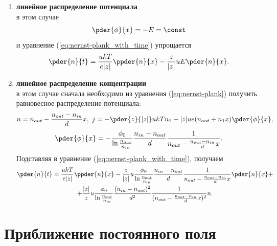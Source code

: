 \documentclass{hedwork}
\begin{document}
    \begin{enumerate}
        \item \textbf{линейное распределение потенциала}\\
            в этом случае
            \[
                \pder{\phi}{x} = -E = \const
            \]
            и уравнение (\ref{eq:nernst-plank_with_time}) упрощается
            \begin{equation}
                \pder{n}{t} = \frac{ukT}{e|z|}\ppder{n}{x} -
                    \frac{z}{|z|}uE\pder{n}{x}.
            \end{equation}
        \item \textbf{линейное распределение концентрации}\\
            в этом случае сначала необходимо из уравнения
            (\ref{eq:nernst-plank}) получить равновесное распределение
            потенциала:
            \[
                n = n_{out} - \frac{n_{out} - n_{in}}{d} x,\ j = -\pder{z}{|z|}ukTn_1 -
                    |z|ue(n_{out}+n_1x)\pder{\phi}{x},
            \]
            \[
                \pder{\phi}{x} = -\frac{\phi_0}{\ln\frac{n_{out}}{n_{in}}}
                \frac{n_{in} - n_{out}}{d}
                \frac{1}{n_{out} - \frac{n_{out} - n_{in}}{d} x}.
            \]
            Подставляя в уравнение (\ref{eq:nernst-plank_with_time}), получаем
            \begin{gather}
                \pder{n}{t} = \frac{ukT}{e|z|}\ppder{n}{x} -
                \frac{z}{|z|}u\frac{\phi_0}{\ln\frac{n_{out}}{n_{in}}}
                \frac{n_{in} - n_{out}}{d}
                \frac{1}{n_{out} - \frac{n_{out} - n_{in}}{d} x}
                \pder{n}{x} + \nonumber \\
                + \frac{|z|}{z}u\frac{\phi_0}{\ln\frac{n_{out}}{n_{in}}}
                \frac{(n_{in} - n_{out})^2}{d^2}
                \frac{1}{(n_{out} - \frac{n_{out} - n_{in}}{d} x)^2}n.
            \end{gather}
    \end{enumerate}

\section{Приближение постоянного поля}
\end{document}
